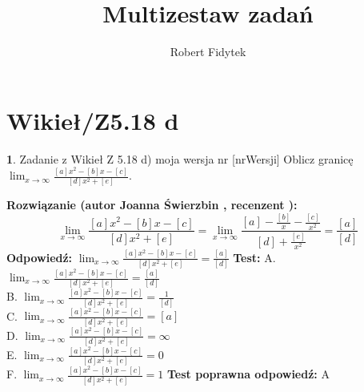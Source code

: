 \documentclass[12pt, a4paper]{article}
\title{Multizestaw zadań}
\author{Robert Fidytek}
\date{}
\theoremstyle{definition} %
\newtheorem{zad}{}
\newcommand{\kategoria}[1]{\section{#1}} %
\newcommand{\zadStart}[1]{\begin{zad}#1\newline} %
\newcommand{\zadStop}{\end{zad}}   %
\newcommand{\rozwStart}[2]{\noindent \textbf{Rozwiązanie (autor #1 , recenzent #2): }\newline} %
\newcommand{\rozwStop}{\newline}                                            %
\newcommand{\odpStart}{\noindent \textbf{Odpowiedź:}\newline}    %
\newcommand{\odpStop}{\newline}                                             %
\newcommand{\testStart}{\noindent \textbf{Test:}\newline} %
\newcommand{\testStop}{\newline} %
\newcommand{\kluczStart}{\noindent \textbf{Test poprawna odpowiedź:}\newline} %
\newcommand{\kluczStop}{\newline} %
\begin{document}
\maketitle


\kategoria{Wikieł/Z5.18 d}
\zadStart{Zadanie z Wikieł Z 5.18 d) moja wersja nr [nrWersji]}
Oblicz granicę $\lim_{x \rightarrow \infty} \frac{[a]x^2-[b]x-[c]}{[d]x^2+[e]}$.
\zadStop
\rozwStart{Joanna Świerzbin}{}
$$\lim_{x \rightarrow \infty} \frac{[a]x^2-[b]x-[c]}{[d]x^2+[e]} = \lim_{x \rightarrow \infty} \frac{[a]-\frac{[b]}{x}-\frac{[c]}{x^2}}{[d]+\frac{[e]}{x^2}} = \frac{[a]}{[d]} $$
\rozwStop
\odpStart
$\lim_{x \rightarrow \infty} \frac{[a]x^2-[b]x-[c]}{[d]x^2+[e]} = \frac{[a]}{[d]} $
\odpStop
\testStart
A. $\lim_{x \rightarrow \infty} \frac{[a]x^2-[b]x-[c]}{[d]x^2+[e]} = \frac{[a]}{[d]} $\\
B. $\lim_{x \rightarrow \infty} \frac{[a]x^2-[b]x-[c]}{[d]x^2+[e]} = \frac{1}{[d]} $ \\
C. $\lim_{x \rightarrow \infty} \frac{[a]x^2-[b]x-[c]}{[d]x^2+[e]} = [a] $ \\
D. $\lim_{x \rightarrow \infty} \frac{[a]x^2-[b]x-[c]}{[d]x^2+[e]} = \infty $\\
E. $\lim_{x \rightarrow \infty} \frac{[a]x^2-[b]x-[c]}{[d]x^2+[e]} = 0 $\\
F. $\lim_{x \rightarrow \infty} \frac{[a]x^2-[b]x-[c]}{[d]x^2+[e]} = 1 $
\testStop
\kluczStart
A
\kluczStop
\end{document}
